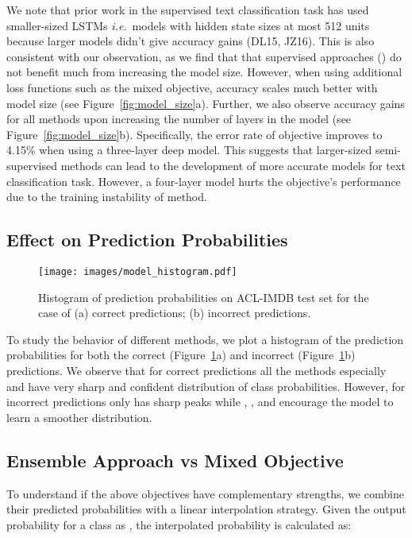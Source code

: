 \documentclass[letterpaper]{article}
\begin{document}
We note that prior work in the supervised text classification task has used smaller-sized LSTMs \emph{i.e.}\ models with hidden state sizes at most 512 units because larger models didn't give accuracy gains (DL15, JZ16). This is also consistent with our observation, as we find that that supervised approaches () do not benefit much from increasing the model size. However, when using additional loss functions such as the mixed objective, accuracy scales much better with model size (see Figure~\ref{fig:model_size}a). Further, we also observe accuracy gains for all methods upon increasing the number of layers in the model (see Figure~\ref{fig:model_size}b). Specifically, the error rate of  objective improves to 4.15\% when using a three-layer deep model. This suggests that larger-sized semi-supervised methods can lead to the development of more accurate models for text classification task. However, a four-layer model hurts the  objective's performance due to the training instability of  method.

\subsection{Effect on Prediction Probabilities}
\begin{figure}[t]
\begin{minipage}{\linewidth}
\centering
\texttt{[image: images/model\_histogram.pdf]}
\end{minipage}
\caption{Histogram of prediction probabilities on ACL-IMDB test set for the case of (a) correct predictions; (b) incorrect predictions.}
\label{fig:model_histogram}
\end{figure}

To study the behavior of different methods, we plot a histogram of the prediction probabilities for both the correct (Figure~\ref{fig:model_histogram}a) and incorrect (Figure~\ref{fig:model_histogram}b) predictions.
We observe that for correct predictions all the methods especially  and  have very sharp and confident distribution of class probabilities. However, for incorrect predictions only  has sharp peaks while , , and  encourage the model to learn a smoother distribution.

\subsection{Ensemble Approach vs Mixed Objective}
To understand if the above objectives have complementary strengths, we combine their predicted probabilities with a linear interpolation strategy. Given the output probability for a class  as , the interpolated probability  is calculated as:
\end{document}

